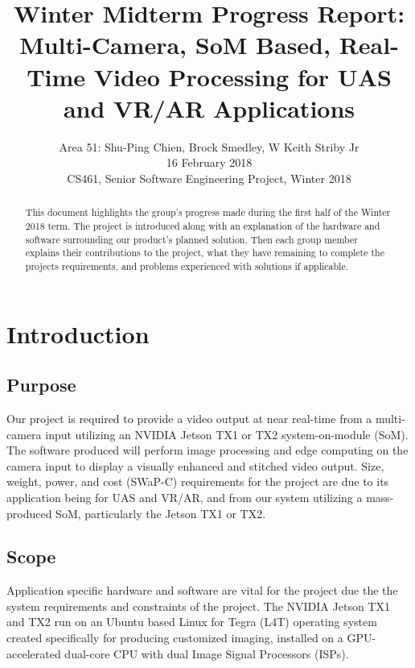 \documentclass[letterpaper,10pt,serif,draftclsnofoot,onecolumn,compsoc,titlepage]{IEEEtran}
\title{Winter Midterm Progress Report: Multi-Camera, SoM Based, Real-Time Video Processing for UAS and VR/AR Applications}
\author{Area 51: Shu-Ping Chien, Brock Smedley, W Keith Striby Jr \\ 16 February 2018 \\ CS461, Senior Software Engineering Project, Winter 2018}
\begin{document}
\begin{titlepage}
\maketitle

\begin{abstract}

This document highlights the group's progress made during the first half of the 
Winter 2018 term. The project is introduced along with an explanation of the 
hardware and software surrounding our product's planned solution. Then each group member
explains their contributions to the project, what they have remaining to complete
the projects requirements, and problems experienced with solutions if applicable. \\


\thispagestyle{empty}
\end{abstract}
\end{titlepage}

\newpage
\tableofcontents

\newpage

\section{Introduction}

\subsection{Purpose}
Our project is required to provide a video output at near real-time from a 
multi-camera input utilizing an NVIDIA Jetson TX1 or TX2 system-on-module (SoM). 
The software produced will perform image processing and edge computing on the 
camera input to display a visually enhanced and stitched video output. 
Size, weight, power, and cost (SWaP-C) requirements for the project are due 
to its application being for UAS and VR/AR, and from our system utilizing a 
mass-produced SoM, particularly the Jetson TX1 or TX2. \\

\subsection{Scope}
Application specific hardware and software are vital for the project due the the 
system requirements and constraints of the project.
The NVIDIA Jetson TX1 and TX2 run on an Ubuntu based Linux for Tegra (L4T) operating 
system created specifically for producing customized imaging, installed on a 
GPU-accelerated dual-core CPU with dual Image Signal Processors (ISPs). \\
\end{document}
